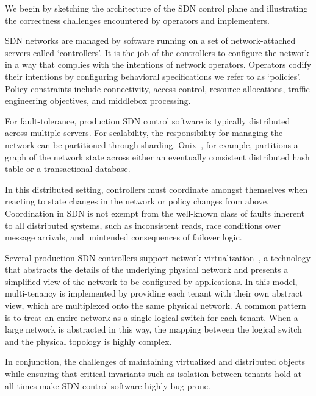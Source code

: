 We begin by sketching the architecture of the SDN control plane and
illustrating the correctness challenges encountered by operators and
implementers.

SDN networks are managed by software running on a set of network-attached
servers called `controllers'. It is the job of the controllers to configure
the network in a way that complies with the intentions of network
operators. Operators codify their intentions by configuring
behavioral specifications we refer to as `policies'. Policy constraints
include connectivity, access control,
resource allocations, traffic engineering objectives, and middlebox
processing.

For fault-tolerance, production SDN control software is typically
distributed across multiple servers. For scalability, the responsibility for
managing the network can be partitioned through sharding.
Onix~\cite{onix}, for example, partitions a
graph of the network state across either an eventually consistent
distributed hash table or a
transactional database.

In this distributed setting, controllers must coordinate amongst themselves
when reacting to state changes in the network or
policy changes from above.
Coordination in SDN is not exempt from the well-known class of faults
inherent to all distributed systems, such as
inconsistent reads, race conditions over message arrivals, and
unintended consequences of failover logic.

Several production SDN controllers support network
virtualization~\cite{bigswitch,nicirahomepage,contextream}, a technology that
abstracts the details of the underlying physical network and presents a
simplified view of the network to be configured by applications.
In this model, multi-tenancy is implemented by providing each tenant with their
own abstract view, which are multiplexed onto the same physical network.
A common pattern is to treat an entire network as a single logical switch for each
tenant. When a large network is
abstracted in this way, the mapping between
the logical switch and the physical topology is highly complex.

In conjunction, the challenges of maintaining virtualized and distributed
objects while ensuring that critical invariants such as isolation between
tenants hold at all times make
SDN control software highly bug-prone.

